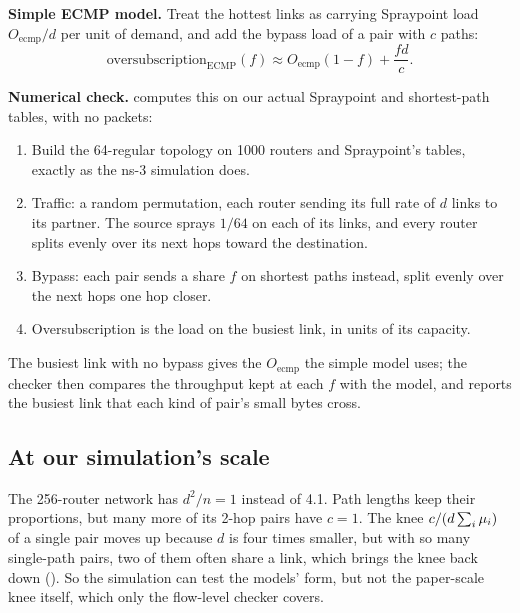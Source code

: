 \textbf{Simple ECMP model.} Treat the hottest links as carrying Spraypoint load $O_{\text{ecmp}}/d$ per unit of demand, and add the bypass load of a pair with $c$ paths:
\[
\text{oversubscription}_{\text{ECMP}}(f) \approx O_{\text{ecmp}} (1 - f) + \frac{f d}{c}.
\]

\textbf{Numerical check.}  computes this on our actual Spraypoint and shortest-path tables, with no packets:
\begin{enumerate}
  \item Build the 64-regular topology on 1000 routers and Spraypoint's tables, exactly as the ns-3 simulation does.
  \item Traffic: a random permutation, each router sending its full rate of $d$ links to its partner. The source sprays $1/64$ on each of its links, and every router splits evenly over its next hops toward the destination.
  \item Bypass: each pair sends a share $f$ on shortest paths instead, split evenly over the next hops one hop closer.
  \item Oversubscription is the load on the busiest link, in units of its capacity.
\end{enumerate}

The busiest link with no bypass gives the $O_{\text{ecmp}}$ the simple model uses; the checker then compares the throughput kept at each $f$ with the model, and reports the busiest link that each kind of pair's small bytes cross.

\subsection{At our simulation's scale}
\label{sec:models-scale}

The 256-router network has $d^2/n = 1$ instead of 4.1. Path lengths keep their proportions, but many more of its 2-hop pairs have $c = 1$. The knee $c/(d \textstyle\sum_i \mu_i)$ of a single pair moves up because $d$ is four times smaller, but with so many single-path pairs, two of them often share a link, which brings the knee back down (). So the simulation can test the models' form, but not the paper-scale knee itself, which only the flow-level checker covers.

